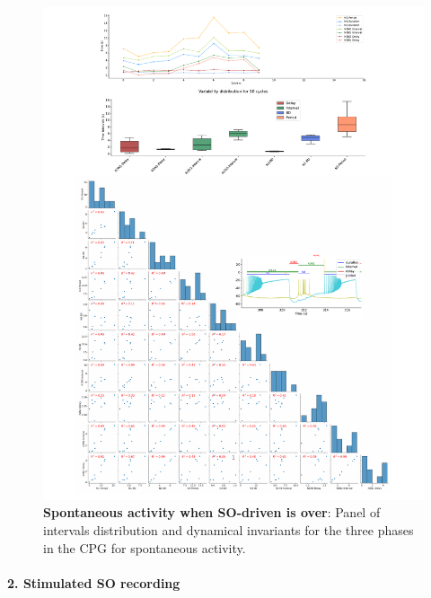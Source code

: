  
\begin{figure}[htbp]
	\centering
	\includegraphics[width=1.1\textwidth]{./invariants/data/SUSSEX/prep4_so_no_driven/images/panel_with_pairplot.pdf}
	\caption{\textbf{Spontaneous activity when SO-driven is over}: Panel of intervals distribution and dynamical invariants for the three phases in the CPG for spontaneous activity.}
	\label{fig:no so spontaneous invariants pairplot}
\end{figure}
 
\paragraph{2. Stimulated SO recording}


